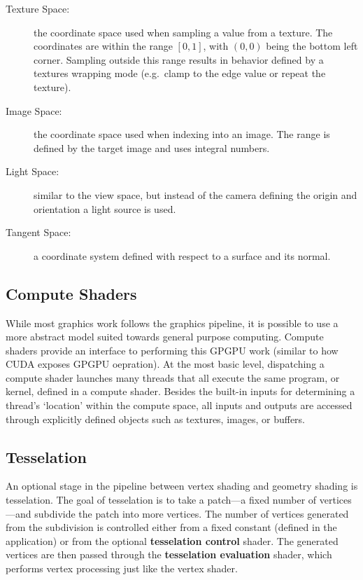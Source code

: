 \begin{description}
    \item[Texture Space:] the coordinate space used when sampling a value from a texture. The coordinates are within the range $[0, 1]$, with $(0, 0)$ being the bottom left corner. Sampling outside this range results in behavior defined by a textures wrapping mode (e.g.\ clamp to the edge value or repeat the texture).
    \item[Image Space:] the coordinate space used when indexing into an image. The range is defined by the target image and uses integral numbers.
    \item[Light Space:] similar to the view space, but instead of the camera defining the origin and orientation a light source is used.
    \item[Tangent Space:] a coordinate system defined with respect to a surface and its normal.
\end{description}

\subsection{Compute Shaders}
While most graphics work follows the graphics pipeline, it is possible to use a more abstract model suited towards general purpose computing. Compute shaders provide an interface to performing this GPGPU work (similar to how CUDA exposes GPGPU oepration). At the most basic level, dispatching a compute shader launches many threads that all execute the same program, or kernel, defined in a compute shader. Besides the built-in inputs for determining a thread's `location' within the compute space, all inputs and outputs are accessed through explicitly defined objects such as textures, images, or buffers.

\subsection{Tesselation}
An optional stage in the pipeline between vertex shading and geometry shading is tesselation. The goal of tesselation is to take a patch---a fixed number of vertices---and subdivide the patch into more vertices. The number of vertices generated from the subdivision is controlled either from a fixed constant (defined in the application) or from the optional \textbf{tesselation control} shader. The generated vertices are then passed through the \textbf{tesselation evaluation} shader, which performs vertex processing just like the vertex shader.


